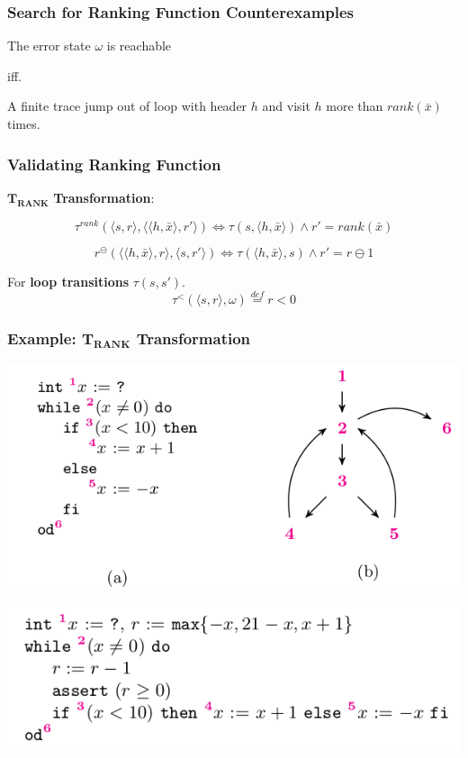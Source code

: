\documentclass[11pt]{beamer}
\begin{document}
\begin{frame}\frametitle{Search for Ranking Function Counterexamples}

\begin{theorem}
The error state $\omega$ is reachable

iff.

A finite trace jump out of loop with header $h$ and visit $h$ more than $rank(\bar{x})$ times.

\end{theorem}
\end{frame}

\begin{frame}\frametitle{Validating Ranking Function}

$\mathbf{T_{RANK}}$ \textbf{Transformation}:

\[\tau^{rank}(\langle s,r\rangle, \langle\langle h, \bar{x}\rangle, r' \rangle) \Leftrightarrow \tau(s, \langle h, \bar{x}\rangle) \wedge r' = rank(\bar{x})\]

\[r^{\ominus}(\langle\langle h, \bar{x}\rangle, r\rangle, \langle s, r'\rangle)\Leftrightarrow \tau(\langle h, \bar{x}\rangle, s) \wedge r' = r \ominus 1\]

For \textbf{loop transitions} $\tau(s, s')$.
\[\tau^{<}(\langle s,r\rangle, \omega) \stackrel{def}{=} r < 0\]
\end{frame}

\begin{frame}\frametitle{Example: $\mathbf{T_{RANK}}$ Transformation}
\begin{center}
\includegraphics[scale=0.4]{cfgloops.png}

\includegraphics[scale=0.4]{trank.png}
\end{center}
\end{frame}
\end{document}
